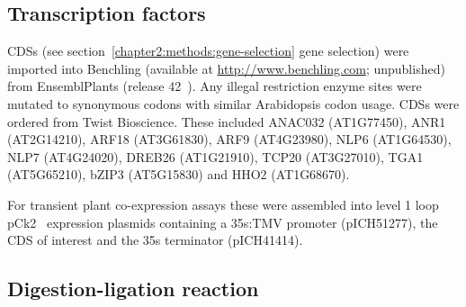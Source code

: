 \documentclass[../main.tex]{subfiles}
\begin{document}
\subsection{Transcription factors}\label{chapter2:methods:synthetic-transcription-factors}

CDSs (see section~{\ref{chapter2:methods:gene-selection}} gene selection) were imported into Benchling (available at \url{http://www.benchling.com}; unpublished) from EnsemblPlants (release 42~\autocite{kerseyEnsemblGenomes20182018}).
Any illegal restriction enzyme sites were mutated to synonymous codons with similar Arabidopsis codon usage.
CDSs were ordered from Twist Bioscience.
These included ANAC032 (AT1G77450), ANR1 (AT2G14210), ARF18 (AT3G61830), ARF9 (AT4G23980), NLP6 (AT1G64530), NLP7 (AT4G24020), DREB26 (AT1G21910), TCP20 (AT3G27010), TGA1 (AT5G65210), bZIP3 (AT5G15830) and HHO2 (AT1G68670).

For transient plant co\hyp{}expression assays these were assembled into level 1 loop pCk2~\autocite{pollakLoopAssemblySimple2018} expression plasmids containing a 35s:TMV promoter (pICH51277), the CDS of interest and the 35s terminator (pICH41414).



\subsection{Digestion-ligation reaction}\label{chapter2:methods:digestion-ligation-reaction}
\end{document}
